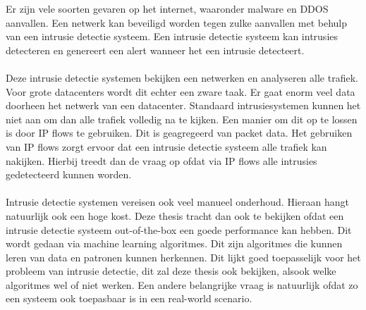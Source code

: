 \begin{samenvatting}
\addchaptertocentry{\nederlandsesamenvatting}

\noindent Er zijn vele soorten gevaren op het internet, waaronder malware en DDOS aanvallen. Een netwerk kan beveiligd worden tegen zulke aanvallen met behulp van een intrusie detectie systeem. Een intrusie detectie systeem kan intrusies detecteren en genereert een alert wanneer het een intrusie detecteert. \\
\\
Deze intrusie detectie systemen bekijken een netwerken en analyseren alle trafiek. Voor grote datacenters wordt dit echter een zware taak. Er gaat enorm veel data doorheen het netwerk van een datacenter. Standaard intrusiesystemen kunnen het niet aan om dan alle trafiek volledig na te kijken. Een manier om dit op te lossen is door IP flows te gebruiken. Dit is geagregeerd van packet data. Het gebruiken van IP flows zorgt ervoor dat een intrusie detectie systeem alle trafiek kan nakijken. Hierbij treedt dan de vraag op ofdat via IP flows alle intrusies gedetecteerd kunnen worden. \\
\\
Intrusie detectie systemen vereisen ook veel manueel onderhoud. Hieraan hangt natuurlijk ook een hoge kost. Deze thesis tracht dan ook te bekijken ofdat een intrusie detectie systeem out-of-the-box een goede performance kan hebben. Dit wordt gedaan via machine learning algoritmes. Dit zijn algoritmes die kunnen leren van data en patronen kunnen herkennen. Dit lijkt goed toepasselijk voor het probleem van intrusie detectie, dit zal deze thesis ook bekijken, alsook welke algoritmes wel of niet werken. Een andere belangrijke vraag is natuurlijk ofdat zo een systeem ook toepasbaar is in een real-world scenario. 


\end{samenvatting}
